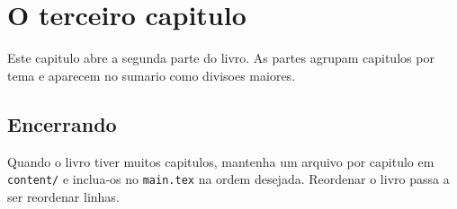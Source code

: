 \chapter{O terceiro capitulo}
\label{cap:terceiro}

Este capitulo abre a segunda parte do livro. As partes agrupam capitulos por
tema e aparecem no sumario como divisoes maiores.

\section{Encerrando}

Quando o livro tiver muitos capitulos, mantenha um arquivo por capitulo em
\texttt{content/} e inclua-os no \texttt{main.tex} na ordem desejada. Reordenar
o livro passa a ser reordenar linhas.
